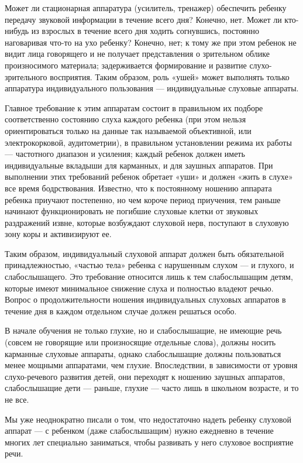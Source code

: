\documentclass[a5paper]{book}
\begin{document}
Может ли стационарная аппаратура (усилитель, тренажер) обеспечить
ребенку передачу звуковой информации в течение всего дня? Конечно, нет.
Может ли кто-нибудь из взрослых в течение всего дня ходить согнувшись,
постоянно наговаривая что-то на ухо ребенку? Конечно, нет; к тому же при
этом ребенок не видит лица говорящего и не получает представления о
зрительном облике произносимого материала; задерживается формирование и
развитие слухо-зрительного восприятия. Таким образом, роль «ушей» может
выполнять только аппаратура индивидуального пользования ---
индивидуальные слуховые аппараты.

Главное требование к этим аппаратам состоит в правильном их подборе
соответственно состоянию слуха каждого ребенка (при этом нельзя
ориентироваться только на данные так называемой объективной, или
электрокорковой, аудитометрии), в правильном установлении режима их
работы --- частотного диапазон и усиления; каждый ребенок должен иметь
индивидуальные вкладыши для карманных, и для заушных аппаратов. При
выполнении этих требований ребенок обретает «уши» и должен «жить в
слухе» все время бодрствования. Известно, что к постоянному ношению
аппарата ребенка приучают постепенно, но чем короче период приучения,
тем раньше начинают функционировать не погибшие слуховые клетки от
звуковых раздражений извне, которые возбуждают слуховой нерв, поступают
в слуховую зону коры и активизируют ее.

Таким образом, индивидуальный слуховой аппарат должен быть обязательной
принадлежностью, «частью тела» ребенка с нарушенным слухом --- и
глухого, и слабослышащего. Это требование относится лишь к тем
слабослышащим детям, которые имеют минимальное снижение слуха и
полностью владеют речью. Вопрос о продолжительности ношения
индивидуальных слуховых аппаратов в течение дня в каждом отдельном
случае должен решаться особо.

В начале обучения не только глухие, но и слабослышащие, не имеющие речь
(совсем не говорящие или произносящие отдельные слова), должны носить
карманные слуховые аппараты, однако слабослышащие должны пользоваться
менее мощными аппаратами, чем глухие. Впоследствии, в зависимости от
уровня слухо-речевого развития детей, они переходят к ношению заушных
аппаратов, слабослышащие дети --- раньше, глухие --- часто лишь в
школьном возрасте, и то не все.

Мы уже неоднократно писали о том, что недостаточно надеть ребенку
слуховой аппарат --- с ребенком (даже слабослышащим) нужно ежедневно в
течение многих лет специально заниматься, чтобы развивать у него
слуховое восприятие речи.
\end{document}
